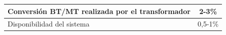 \begin{table}
\begin{tabular}{>{\centering}p{8cm}c}
                                                                                                                                                                                                                                       \midrule 
                                                                                                                                                                                                                                       Conversión BT/MT realizada por el transformador & 2-3\%\tabularnewline
                                                                                                                                                                                                                                                                                         \midrule 
                                                                                                                                                                                                                                                                                         Disponibilidad del sistema  & 0,5-1\%\tabularnewline
                                                                                                                                                                                                                                                                                                                       \bottomrule
\end{tabular}
\end{table}






